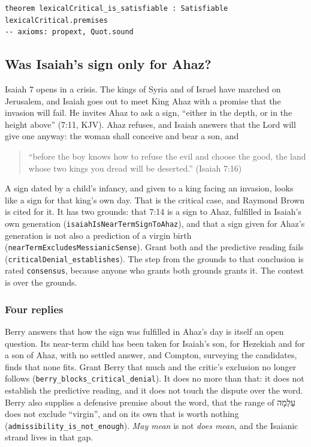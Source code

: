 \documentclass[11pt]{article}
\begin{document}
{\small\begin{verbatim}
theorem lexicalCritical_is_satisfiable : Satisfiable lexicalCritical.premises
-- axioms: propext, Quot.sound
\end{verbatim}}
\subsection*{Was Isaiah’s sign only for Ahaz?}
Isaiah 7 opens in a crisis. The kings of Syria and of Israel have marched on Jerusalem, and Isaiah goes out to meet King Ahaz with a promise that the invasion will fail. He invites Ahaz to ask a sign, “either in the depth, or in the height above” (7:11, KJV). Ahaz refuses, and Isaiah answers that the Lord will give one anyway: the woman shall conceive and bear a son, and

\begin{quote}
“before the boy knows how to refuse the evil and choose the good, the land whose two kings you dread will be deserted.” (Isaiah 7:16)

\end{quote}
A sign dated by a child’s infancy, and given to a king facing an invasion, looks like a sign for that king’s own day. That is the critical case, and Raymond Brown is cited for it. It has two grounds: that 7:14 is a sign to Ahaz, fulfilled in Isaiah’s own generation (\texttt{isaiah\allowbreak{}Is\allowbreak{}Near\allowbreak{}Term\allowbreak{}Sign\allowbreak{}To\allowbreak{}Ahaz}), and that a sign given for Ahaz’s generation is not also a prediction of a virgin birth (\texttt{near\allowbreak{}Term\allowbreak{}Excludes\allowbreak{}Messianic\allowbreak{}Sense}). Grant both and the predictive reading fails (\texttt{critical\allowbreak{}Denial\_\allowbreak{}establishes}). The step from the grounds to that conclusion is rated \texttt{consensus}, because anyone who grants both grounds grants it. The contest is over the grounds.

\subsubsection*{Four replies}
Berry answers that how the sign was fulfilled in Ahaz’s day is itself an open question. Its near-term child has been taken for Isaiah’s son, for Hezekiah and for a son of Ahaz, with no settled answer, and Compton, surveying the candidates, finds that none fits. Grant Berry that much and the critic’s exclusion no longer follows (\texttt{berry\_\allowbreak{}blocks\_\allowbreak{}critical\_\allowbreak{}denial}). It does no more than that: it does not establish the predictive reading, and it does not touch the dispute over the word. Berry also supplies a defensive premise about the word, that the range of עַלְמָה does not exclude “virgin”, and on its own that is worth nothing (\texttt{admissibility\_\allowbreak{}is\_\allowbreak{}not\_\allowbreak{}enough}). \emph{May mean} is not \emph{does mean}, and the Isaianic strand lives in that gap.
\end{document}
